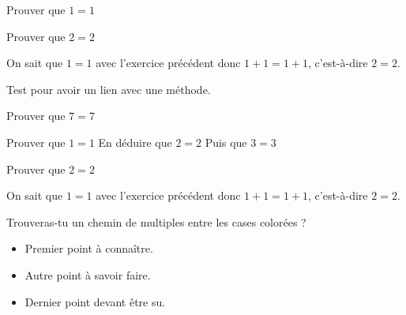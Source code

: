 \documentclass[nocrop]{sesamanuel}
\begin{document}
\exercicesappr
\begin{colonne*exercice}
  \begin{exercice}
  Prouver que $1=1$
  \end{exercice}
  \begin{exercice*}
  Prouver que $2=2$
  \end{exercice*}
  \begin{corrige}
  On sait que $1=1$ avec l’exercice précédent donc $1+1=1+1$,
  c’est-à-dire $2=2$.
  \end{corrige}
  \begin{exercice}
  \label{exo-exemple4}
  Test pour avoir un lien avec une méthode.
  \end{exercice}
  \begin{exercice}
    Prouver que $7=7$
  \end{exercice}

  \begin{exercice}
    \partie
    Prouver que $1=1$
    \partie
    En déduire que $2=2$
    \partie 
    Puis que $3=3$
  \end{exercice}
  \begin{exercice*}
  Prouver que $2=2$
  \end{exercice*}
  \begin{corrige}
  On sait que $1=1$ avec l’exercice précédent donc $1+1=1+1$,
  c’est-à-dire $2=2$.
  \end{corrige}
\end{colonne*exercice}


\recreation
\begin{enigme}
  Trouveras-tu un chemin de multiples entre les cases colorées ?
  \par
  \LabyNombre[Multiple=7,Longueur=12,Largeur=8,XDepart=2,YDepart=2,XArrivee=11,YArrivee=6,Murs]
\end{enigme}


\connaissances
\begin{acquis}
\begin{itemize}
\item Premier point à connaître.
\item Autre point à savoir faire.
\item Dernier point devant être su.
\end{itemize}
\end{acquis}
\end{document}
